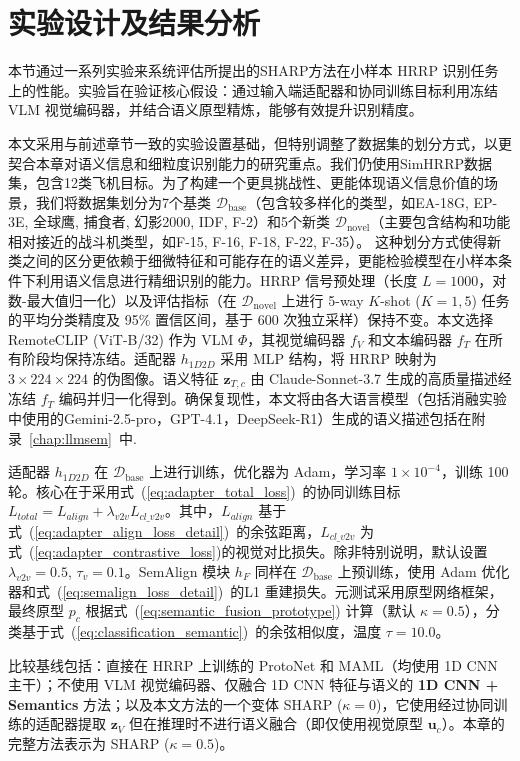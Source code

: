 \section{实验设计及结果分析} \label{sec:experiments_semantic} 本节通过一系列实验来系统评估所提出的SHARP方法在小样本 HRRP 识别任务上的性能。实验旨在验证核心假设：通过输入端适配器和协同训练目标利用冻结 VLM 视觉编码器，并结合语义原型精炼，能够有效提升识别精度。

本文采用与前述章节一致的实验设置基础，但特别调整了数据集的划分方式，以更契合本章对语义信息和细粒度识别能力的研究重点。我们仍使用SimHRRP数据集，包含12类飞机目标。为了构建一个更具挑战性、更能体现语义信息价值的场景，我们将数据集划分为7个基类 $\mathcal{D}_{\text{base}}$（包含较多样化的类型，如EA-18G, EP-3E, 全球鹰, 捕食者, 幻影2000, IDF, F-2）和5个新类 $\mathcal{D}_{\text{novel}}$（主要包含结构和功能相对接近的战斗机类型，如F-15, F-16, F-18, F-22, F-35）。 这种划分方式使得新类之间的区分更依赖于细微特征和可能存在的语义差异，更能检验模型在小样本条件下利用语义信息进行精细识别的能力。HRRP 信号预处理（长度 $L=1000$，对数-最大值归一化）以及评估指标（在 $\mathcal{D}_{\text{novel}}$ 上进行 5-way $K$-shot ($K=1, 5$) 任务的平均分类精度及 95\% 置信区间，基于 600 次独立采样）保持不变。本文选择 RemoteCLIP (ViT-B/32) 作为 VLM $\Phi$，其视觉编码器 $f_V$ 和文本编码器 $f_T$ 在所有阶段均保持冻结。适配器 $h_{1D2D}$ 采用 MLP 结构，将 HRRP 映射为 $3 \times 224 \times 224$ 的伪图像。语义特征 $\mathbf{z}_{T,c}$ 由 Claude-Sonnet-3.7 生成的高质量描述经冻结 $f_T$ 编码并归一化得到。确保复现性，本文将由各大语言模型（包括消融实验中使用的Gemini-2.5-pro，GPT-4.1，DeepSeek-R1）生成的语义描述包括在附录~\ref{chap:llmsem}~中.

适配器 $h_{1D2D}$ 在 $\mathcal{D}_{\text{base}}$ 上进行训练，优化器为 Adam，学习率 $1 \times 10^{-4}$，训练 100 轮。核心在于采用式~(\ref{eq:adapter_total_loss})~的协同训练目标 $L_{total} = L_{align} + \lambda_{v2v} L_{cl\_v2v}$。其中，$L_{align}$ 基于式~(\ref{eq:adapter_align_loss_detail})~的余弦距离，$L_{cl\_v2v}$ 为式~(\ref{eq:adapter_contrastive_loss})的视觉对比损失。除非特别说明，默认设置 $\lambda_{v2v}=0.5$, $\tau_v=0.1$。SemAlign 模块 $h_F$ 同样在 $\mathcal{D}_{\text{base}}$ 上预训练，使用 Adam 优化器和式~(\ref{eq:semalign_loss_detail})~的L1 重建损失。元测试采用原型网络框架，最终原型 $p_c$ 根据式~(\ref{eq:semantic_fusion_prototype}) 计算（默认 $\kappa=0.5$），分类基于式~(\ref{eq:classification_semantic})~的余弦相似度，温度 $\tau=10.0$。

比较基线包括：直接在 HRRP 上训练的 ProtoNet 和 MAML（均使用 1D CNN 主干）；不使用 VLM 视觉编码器、仅融合 1D CNN 特征与语义的 \textbf{1D CNN + Semantics} 方法；以及本文方法的一个变体 {SHARP ($\kappa=0$)}，它使用经过协同训练的适配器提取 $\mathbf{z}_V$ 但在推理时不进行语义融合（即仅使用视觉原型 $\mathbf{u}_c$）。本章的完整方法表示为 {SHARP ($\kappa=0.5$)}。

